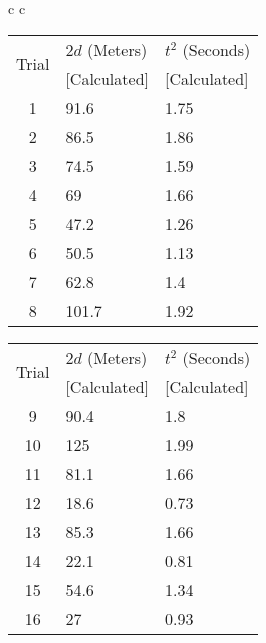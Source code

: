 \documentclass{article}
\begin{document}
\def\arraystretch{1.2}%
\begin{center}
    \begin{tabular}{c c}
        \begin{tabular}{ | c l l | }
            \hline
            \multirow{2}{2em}{Trial} & $2d$ (Meters) & $t^2$ (Seconds)\\
                                 & [Calculated] & [Calculated]\\
            \hline
            1 & 91.6  & 1.75\\
            2 & 86.5  & 1.86\\
            3 & 74.5  & 1.59\\
            4 & 69    & 1.66\\
            5 & 47.2  & 1.26\\
            6 & 50.5  & 1.13\\
            7 & 62.8  & 1.4\\
            8 & 101.7 &	1.92\\
            \hline
        \end{tabular}

        \begin{tabular}{ | c l l | }
            \hline
            \multirow{2}{2em}{Trial} & $2d$ (Meters) & $t^2$ (Seconds)\\
                                 & [Calculated] & [Calculated]\\
            \hline
            9 & 90.4  & 1.8\\
            10 & 125  & 1.99\\
            11 & 81.1 & 1.66\\
            12 & 18.6 & 0.73\\
            13 & 85.3 & 1.66\\
            14 & 22.1 & 0.81\\
            15 & 54.6 & 1.34\\
            16 & 27   & 0.93\\
            \hline
        \end{tabular}
    \end{tabular}
\end{center}
\end{document}
